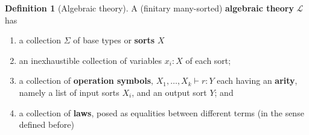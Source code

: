\documentclass[12pt,twoside]{reedthesis}
\theoremstyle{definition}
\newtheorem{definition}{Definition}
\theoremstyle{remark}
\theoremstyle{plain}
\begin{document}
\begin{definition}[Algebraic theory]\label{def:alg theory}
  A (finitary many-sorted) \textbf{algebraic theory} $\mathcal{L}$ has
  \begin{enumerate}
    \item a collection $\Sigma$ of base types or \textbf{sorts} $X$
    \item an inexhaustible collection of variables $x_{i}:X$ of each sort;
    \item a collection of \textbf{operation symbols},
          $X_{1},\dots , X_{k} \vdash r : Y$ each having an \textbf{arity}, namely a
          list of input sorts $X_{i}$, and an output sort $Y$; and
    \item a collection of \textbf{laws}, posed as equalities between different
          terms (in the sense defined before)
  \end{enumerate}
\end{definition}
\end{document}
